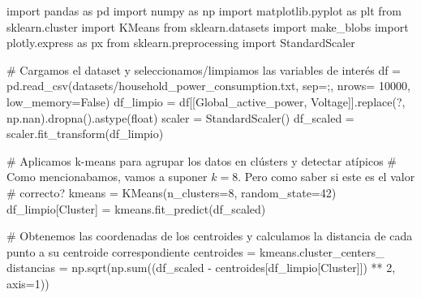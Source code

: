 \documentclass[
  spanish,
  letterpaper,
  DIV=11,
  numbers=noendperiod]{scrreprt}
\newenvironment{Shaded}{}{}
\newcommand{\BuiltInTok}[1]{\textcolor[rgb]{0.84,0.23,0.29}{#1}}
\newcommand{\CommentTok}[1]{\textcolor[rgb]{0.42,0.45,0.49}{#1}}
\newcommand{\DecValTok}[1]{\textcolor[rgb]{0.00,0.36,0.77}{#1}}
\newcommand{\ImportTok}[1]{\textcolor[rgb]{0.01,0.18,0.38}{#1}}
\newcommand{\NormalTok}[1]{\textcolor[rgb]{0.14,0.16,0.18}{#1}}
\newcommand{\OperatorTok}[1]{\textcolor[rgb]{0.14,0.16,0.18}{#1}}
\newcommand{\StringTok}[1]{\textcolor[rgb]{0.01,0.18,0.38}{#1}}
\newcommand{\VariableTok}[1]{\textcolor[rgb]{0.89,0.38,0.04}{#1}}
\begin{document}
\begin{Shaded}
\begin{Highlighting}[numbers=left,,]
\ImportTok{import}\NormalTok{ pandas }\ImportTok{as}\NormalTok{ pd}
\ImportTok{import}\NormalTok{ numpy }\ImportTok{as}\NormalTok{ np}
\ImportTok{import}\NormalTok{ matplotlib.pyplot }\ImportTok{as}\NormalTok{ plt}
\ImportTok{from}\NormalTok{ sklearn.cluster }\ImportTok{import}\NormalTok{ KMeans}
\ImportTok{from}\NormalTok{ sklearn.datasets }\ImportTok{import}\NormalTok{ make\_blobs}
\ImportTok{import}\NormalTok{ plotly.express }\ImportTok{as}\NormalTok{ px}
\ImportTok{from}\NormalTok{ sklearn.preprocessing }\ImportTok{import}\NormalTok{ StandardScaler}

\CommentTok{\# Cargamos el dataset y seleccionamos/limpiamos las variables de interés}
\NormalTok{df }\OperatorTok{=}\NormalTok{ pd.read\_csv(}\StringTok{\textquotesingle{}datasets/household\_power\_consumption.txt\textquotesingle{}}\NormalTok{, sep}\OperatorTok{=}\StringTok{\textquotesingle{};\textquotesingle{}}\NormalTok{, nrows}\OperatorTok{=} \DecValTok{10000}\NormalTok{, low\_memory}\OperatorTok{=}\VariableTok{False}\NormalTok{)}
\NormalTok{df\_limpio }\OperatorTok{=}\NormalTok{ df[[}\StringTok{\textquotesingle{}Global\_active\_power\textquotesingle{}}\NormalTok{, }\StringTok{\textquotesingle{}Voltage\textquotesingle{}}\NormalTok{]].replace(}\StringTok{\textquotesingle{}?\textquotesingle{}}\NormalTok{, np.nan).dropna().astype(}\BuiltInTok{float}\NormalTok{)}
\NormalTok{scaler }\OperatorTok{=}\NormalTok{ StandardScaler()}
\NormalTok{df\_scaled }\OperatorTok{=}\NormalTok{ scaler.fit\_transform(df\_limpio)}

\CommentTok{\# Aplicamos k{-}means para agrupar los datos en clústers y detectar atípicos}
\CommentTok{\# Como mencionabamos, vamos a suponer $k=8$. Pero como saber si este es el valor}
\CommentTok{\# correcto?}
\NormalTok{kmeans }\OperatorTok{=}\NormalTok{ KMeans(n\_clusters}\OperatorTok{=}\DecValTok{8}\NormalTok{, random\_state}\OperatorTok{=}\DecValTok{42}\NormalTok{)}
\NormalTok{df\_limpio[}\StringTok{\textquotesingle{}Cluster\textquotesingle{}}\NormalTok{] }\OperatorTok{=}\NormalTok{ kmeans.fit\_predict(df\_scaled)}

\CommentTok{\# Obtenemos las coordenadas de los centroides y calculamos la distancia de cada punto a su centroide correspondiente}
\NormalTok{centroides }\OperatorTok{=}\NormalTok{ kmeans.cluster\_centers\_}
\NormalTok{distancias }\OperatorTok{=}\NormalTok{ np.sqrt(np.}\BuiltInTok{sum}\NormalTok{((df\_scaled }\OperatorTok{{-}}\NormalTok{ centroides[df\_limpio[}\StringTok{\textquotesingle{}Cluster\textquotesingle{}}\NormalTok{]]) }\OperatorTok{**} \DecValTok{2}\NormalTok{, axis}\OperatorTok{=}\DecValTok{1}\NormalTok{))}


\end{Highlighting}
\end{Shaded}
\end{document}

